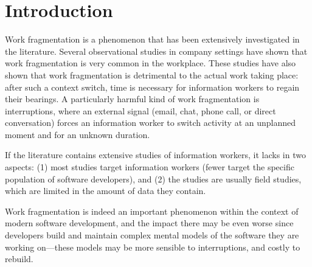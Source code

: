\documentclass[times]{smrauth}
\begin{document}
\section{Introduction}
% 
% 
% 
% 

Work fragmentation is a phenomenon that has been extensively investigated in the literature. Several observational studies in company settings have shown that work fragmentation is very common in the workplace. These studies have also shown that work fragmentation is detrimental to the actual work taking place: after such a context switch, time is necessary for information workers to regain their bearings. A particularly harmful kind of work fragmentation is interruptions, where an external signal (email, chat, phone call, or direct conversation) forces an information worker to switch activity at an unplanned moment and for an unknown duration.

If the literature contains extensive studies of information workers, it lacks in two aspects: (1) most studies target information workers (fewer target the specific population of software developers), and (2) the studies are usually field studies, which are limited in the amount of data they contain.

Work fragmentation is indeed an important phenomenon within the context of modern software development, and the impact there may be even worse since developers build and maintain complex mental models of the software they are working on---these models may be more sensible to interruptions, and costly to rebuild. %
\end{document}
